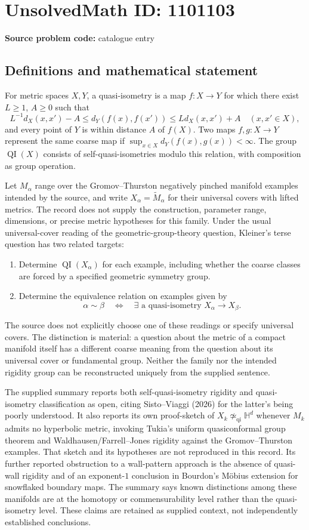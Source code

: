 \documentclass[11pt]{article}
\begin{document}
\section*{UnsolvedMath ID: 1101103}
\textbf{Source problem code:} catalogue entry
\subsection{Definitions and mathematical statement}
For metric spaces $X,Y$, a quasi-isometry is a map $f:X\to Y$ for which there exist $L\geq1$, $A\geq0$ such that
\[
L^{-1}d_X(x,x')-A\leq d_Y(f(x),f(x'))\leq Ld_X(x,x')+A
\quad(x,x'\in X),
\]
and every point of $Y$ is within distance $A$ of $f(X)$. Two maps $f,g:X\to Y$ represent the same coarse map if $\sup_{x\in X}d_Y(f(x),g(x))<\infty$. The group $\operatorname{QI}(X)$ consists of self-quasi-isometries modulo this relation, with composition as group operation.

Let $M_\alpha$ range over the Gromov--Thurston negatively pinched manifold examples intended by the source, and write $X_\alpha=\widetilde M_\alpha$ for their universal covers with lifted metrics. The record does not supply the construction, parameter range, dimensions, or precise metric hypotheses for this family. Under the usual universal-cover reading of the geometric-group-theory question, Kleiner's terse question has two related targets:
\begin{enumerate}
\item Determine $\operatorname{QI}(X_\alpha)$ for each example, including whether the coarse classes are forced by a specified geometric symmetry group.
\item Determine the equivalence relation on examples given by
\[
\alpha\sim\beta\quad\Longleftrightarrow\quad
\exists\text{ a quasi-isometry }X_\alpha\to X_\beta.
\]
\end{enumerate}
The source does not explicitly choose one of these readings or specify universal covers. The distinction is material: a question about the metric of a compact manifold itself has a different coarse meaning from the question about its universal cover or fundamental group. Neither the family nor the intended rigidity group can be reconstructed uniquely from the supplied sentence.

The supplied summary reports both self-quasi-isometry rigidity and quasi-isometry classification as open, citing Sisto--Viaggi (2026) for the latter's being poorly understood. It also reports its own proof-sketch of $X_k\not\simeq_{\mathrm{qi}}\mathbb H^d$ whenever $M_k$ admits no hyperbolic metric, invoking Tukia's uniform quasiconformal group theorem and Waldhausen/Farrell--Jones rigidity against the Gromov--Thurston examples. That sketch and its hypotheses are not reproduced in this record. Its further reported obstruction to a wall-pattern approach is the absence of quasi-wall rigidity and of an exponent-$1$ conclusion in Bourdon's M\"obius extension for snowflaked boundary maps. The summary says known distinctions among these manifolds are at the homotopy or commensurability level rather than the quasi-isometry level. These claims are retained as supplied context, not independently established conclusions.
\end{document}
